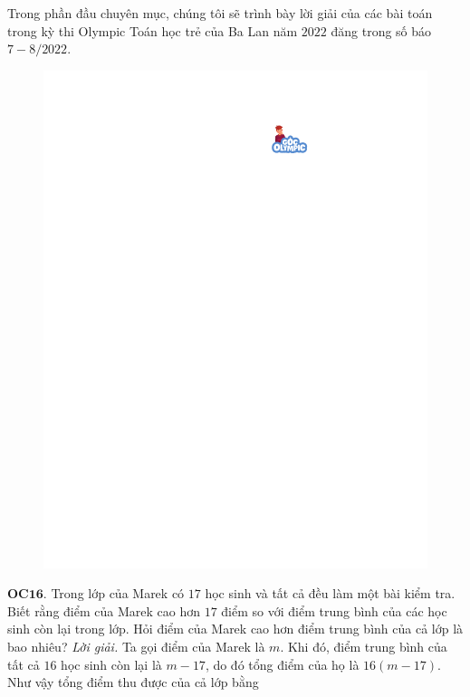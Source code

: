 \begin{multicols}{2}
	Trong phần đầu chuyên mục, chúng tôi sẽ trình bày lời giải của các bài toán trong kỳ thi Olympic Toán học trẻ của Ba Lan năm $2022$  đăng trong số báo $7-8/2022$. 
	\begin{figure}[H]
		\centering
		\vspace*{-5pt}
		\captionsetup{labelformat= empty, justification=centering}
		\includegraphics[width=1\linewidth]{gocolympic}
		\vspace*{-10pt}
	\end{figure}
	{\bf\color{cackithi} OC$\pmb{16.}$}  Trong lớp của Marek có $17$ học sinh và tất cả đều làm một bài kiểm tra. Biết rằng điểm của Marek cao hơn $17$ điểm so với điểm trung bình của các học sinh còn lại trong lớp. Hỏi điểm của Marek cao hơn điểm trung bình của cả lớp là bao nhiêu?
	\vskip 0.1cm
	\textit{Lời giải.} Ta gọi điểm của Marek là $m$. Khi đó, điểm trung bình  của tất cả  $16$ học sinh còn lại là $m - 17$, do đó tổng điểm của họ là $16(m - 17)$. Như vậy tổng điểm thu được của cả lớp bằng

\end{multicols}
